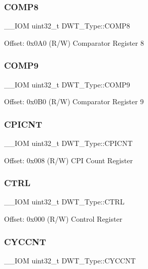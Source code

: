 \subsubsection{\texorpdfstring{COMP8}{COMP8}}
{\footnotesize\ttfamily \+\_\+\+\_\+\+I\+OM uint32\+\_\+t D\+W\+T\+\_\+\+Type\+::\+C\+O\+M\+P8}

Offset\+: 0x0\+A0 (R/W) Comparator Register 8 \mbox{\label{struct_d_w_t___type_abf79b853fc2d25de9c03bdb183e4aee0}} 
\subsubsection{\texorpdfstring{COMP9}{COMP9}}
{\footnotesize\ttfamily \+\_\+\+\_\+\+I\+OM uint32\+\_\+t D\+W\+T\+\_\+\+Type\+::\+C\+O\+M\+P9}

Offset\+: 0x0\+B0 (R/W) Comparator Register 9 \mbox{\label{struct_d_w_t___type_a2c08096c82abe245c0fa97badc458154}} 
\subsubsection{\texorpdfstring{CPICNT}{CPICNT}}
{\footnotesize\ttfamily \+\_\+\+\_\+\+I\+OM uint32\+\_\+t D\+W\+T\+\_\+\+Type\+::\+C\+P\+I\+C\+NT}

Offset\+: 0x008 (R/W) C\+PI Count Register \mbox{\label{struct_d_w_t___type_add790c53410023b3b581919bb681fe2a}} 
\subsubsection{\texorpdfstring{CTRL}{CTRL}}
{\footnotesize\ttfamily \+\_\+\+\_\+\+I\+OM uint32\+\_\+t D\+W\+T\+\_\+\+Type\+::\+C\+T\+RL}

Offset\+: 0x000 (R/W) Control Register \mbox{\label{struct_d_w_t___type_a102eaa529d9098242851cb57c52b42d9}} 
\subsubsection{\texorpdfstring{CYCCNT}{CYCCNT}}
{\footnotesize\ttfamily \+\_\+\+\_\+\+I\+OM uint32\+\_\+t D\+W\+T\+\_\+\+Type\+::\+C\+Y\+C\+C\+NT}

